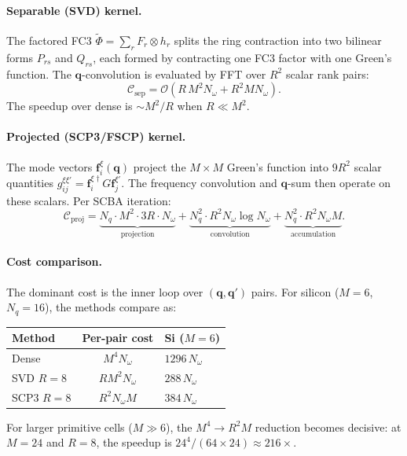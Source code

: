 \documentclass[11pt]{article}
\newcommand{\vc}[1]{\bm{#1}}
\newcommand{\vq}{\vc{q}}
\newcommand{\cO}{\mathcal{O}}
\newcommand{\cC}{\mathcal{C}}
\begin{document}
\paragraph{Separable (SVD) kernel.}
\label{sec:separable_kernel}
The factored FC3 $\tilde\Phi = \sum_r F_r \otimes h_r$ splits the ring
contraction into two bilinear forms $P_{rs}$ and $Q_{rs}$, each formed
by contracting one FC3 factor with one Green's function.  The
$\vq$-convolution is evaluated by FFT over $R^2$ scalar rank pairs:
\begin{equation}
  \cC_\mathrm{sep} = \cO(R\,M^2 N_\omega + R^2 M N_\omega).
\end{equation}
The speedup over dense is $\sim M^2/R$ when $R \ll M^2$.

\paragraph{Projected (SCP3/FSCP) kernel.}
\label{sec:scp3_kernel}
The mode vectors $\vc{f}_i^\xi(\vq)$ project the $M \times M$
Green's function into $9R^2$ scalar quantities
$g_{ij}^{\xi\xi'} = \vc{f}_i^{\xi\dagger} G \vc{f}_j^{\xi'}$.
The frequency convolution and $\vq$-sum then operate on these scalars.
Per SCBA iteration:
\begin{equation}
  \cC_\mathrm{proj}
  = \underbrace{N_q \cdot M^2 \cdot 3R \cdot N_\omega}_{\text{projection}}
  + \underbrace{N_q^2 \cdot R^2 N_\omega \log N_\omega}_{\text{convolution}}
  + \underbrace{N_q^2 \cdot R^2 N_\omega M}_{\text{accumulation}}.
\end{equation}

\paragraph{Cost comparison.}
The dominant cost is the inner loop over $(\vq, \vq')$ pairs.  For
silicon ($M = 6$, $N_q = 16$), the methods compare as:
\begin{center}
\begin{tabular}{@{}lcl@{}}
\toprule
\textbf{Method} & \textbf{Per-pair cost} & \textbf{Si ($M=6$)} \\
\midrule
Dense     & $M^4 N_\omega$    & $1296\, N_\omega$ \\
SVD $R=8$ & $R M^2 N_\omega$  & $288\, N_\omega$  \\
SCP3 $R=8$ & $R^2 N_\omega M$ & $384\, N_\omega$ \\
\bottomrule
\end{tabular}
\end{center}
For larger primitive cells ($M \gg 6$), the $M^4 \to R^2 M$ reduction
becomes decisive: at $M = 24$ and $R = 8$, the speedup is
$24^4 / (64 \times 24) \approx 216\times$.
\end{document}
